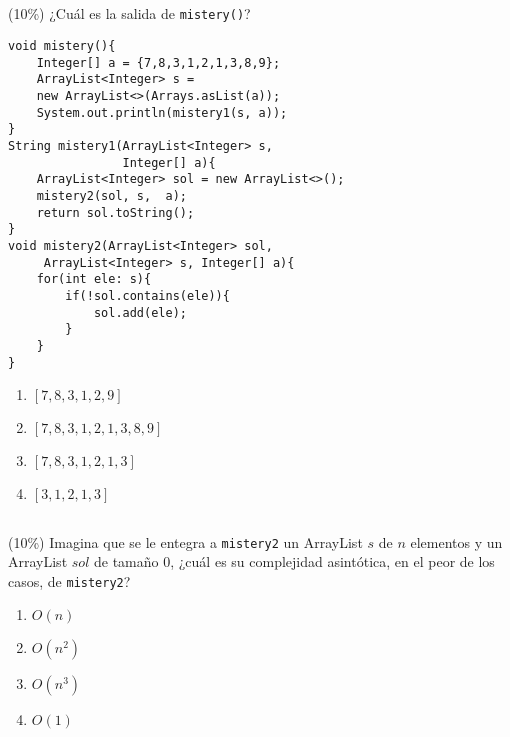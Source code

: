 \documentclass[10 pt]{article}
\begin{document}
\begin{multicols}{2}
\subsection{} (10\%) ¿Cuál es la salida de \texttt{mistery()}?
\begin{lstlisting}
void mistery(){
    Integer[] a = {7,8,3,1,2,1,3,8,9};
	ArrayList<Integer> s = 
	new ArrayList<>(Arrays.asList(a));
	System.out.println(mistery1(s, a));
}
String mistery1(ArrayList<Integer> s, 
                Integer[] a){
	ArrayList<Integer> sol = new ArrayList<>();
	mistery2(sol, s,  a);
	return sol.toString();
}
void mistery2(ArrayList<Integer> sol, 
     ArrayList<Integer> s, Integer[] a){
	for(int ele: s){
		if(!sol.contains(ele)){
			sol.add(ele);
		}
	}
}
\end{lstlisting}
\begin{enumerate}[label=\roman*]
	\item $\left[7, 8, 3, 1, 2, 9\right]$
	\item $\left[7, 8, 3, 1, 2, 1, 3, 8, 9\right]$
	\item $\left[7, 8, 3, 1, 2, 1, 3\right]$
	\item $\left[3, 1, 2, 1, 3\right]$
\end{enumerate}
\subsection{} (10\%) Imagina que se le entegra a \texttt{mistery2} un ArrayList $s$ de $n$ elementos y un ArrayList $sol$ de tamaño $0$, ¿cuál es su complejidad asintótica, en el peor de los casos, de \texttt{mistery2}?
\begin{enumerate}[label=\roman*]
	\item $O(n)$
	\item $O(n^2)$
	\item $O(n^3)$
	\item $O(1)$
\end{enumerate}
\end{multicols}
\end{document}
